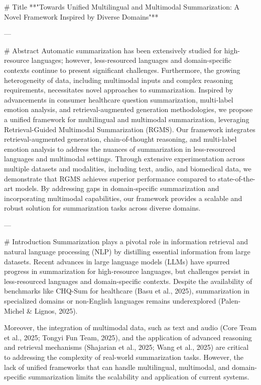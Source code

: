 # Title  
**"Towards Unified Multilingual and Multimodal Summarization: A Novel Framework Inspired by Diverse Domains"**

---

# Abstract  
Automatic summarization has been extensively studied for high-resource languages; however, less-resourced languages and domain-specific contexts continue to present significant challenges. Furthermore, the growing heterogeneity of data, including multimodal inputs and complex reasoning requirements, necessitates novel approaches to summarization. Inspired by advancements in consumer healthcare question summarization, multi-label emotion analysis, and retrieval-augmented generation methodologies, we propose a unified framework for multilingual and multimodal summarization, leveraging Retrieval-Guided Multimodal Summarization (RGMS). Our framework integrates retrieval-augmented generation, chain-of-thought reasoning, and multi-label emotion analysis to address the nuances of summarization in less-resourced languages and multimodal settings. Through extensive experimentation across multiple datasets and modalities, including text, audio, and biomedical data, we demonstrate that RGMS achieves superior performance compared to state-of-the-art models. By addressing gaps in domain-specific summarization and incorporating multimodal capabilities, our framework provides a scalable and robust solution for summarization tasks across diverse domains.

---

# Introduction  
Summarization plays a pivotal role in information retrieval and natural language processing (NLP) by distilling essential information from large datasets. Recent advances in large language models (LLMs) have spurred progress in summarization for high-resource languages, but challenges persist in less-resourced languages and domain-specific contexts. Despite the availability of benchmarks like CHQ-Sum for healthcare (Basu et al., 2025), summarization in specialized domains or non-English languages remains underexplored (Palen-Michel & Lignos, 2025).  

Moreover, the integration of multimodal data, such as text and audio (Core Team et al., 2025; Tongyi Fun Team, 2025), and the application of advanced reasoning and retrieval mechanisms (Shajarian et al., 2025; Wang et al., 2025) are critical to addressing the complexity of real-world summarization tasks. However, the lack of unified frameworks that can handle multilingual, multimodal, and domain-specific summarization limits the scalability and application of current systems.  


